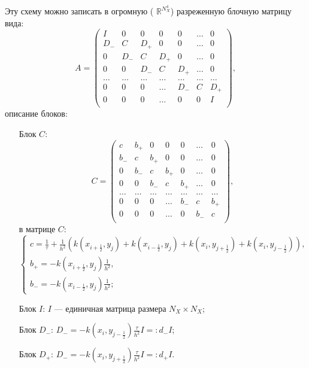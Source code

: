 \documentclass[14pt,a4paper]{extarticle}
\newcommand{\1}{\mathbbm{1}}
\newcommand{\R}{\mathbb{R}}
\begin{document}
Эту схему можно записать в огромную ( $\R ^{N_X^4}$) разреженную блочную матрицу вида:
$$A = \begin{pmatrix}
    I   & 0   & 0     & 0   & 0   & \ldots & 0 \\
    D_-   & C   & D_+   & 0   & 0   & \ldots & 0 \\
    0   & D_-   & C     & D_+ & 0   & \ldots & 0 \\
    0   & 0   & D_-   & C   & D_+ & \ldots & 0 \\
    \ldots & \ldots & \ldots & \ldots & \ldots & \ldots & \ldots \\
    0   & 0   & 0    & \ldots & D_- & C & D_+ \\
    0   & 0   & 0     & \ldots & 0 & 0 & I \\
\end{pmatrix},
$$
описание блоков:
\begin{enumerate}
    \item[Блок $C$:] $$C = \begin{pmatrix}
    c   & b_+ & 0     & 0   & 0   & \ldots & 0 \\
    b_- & c   & b_+   & 0   & 0   & \ldots & 0 \\
    0   & b_- & c     & b_+ & 0   & \ldots & 0 \\
    0   & 0   & b_-   & c   & b_+ & \ldots & 0 \\
    \ldots & \ldots & \ldots & \ldots & \ldots & \ldots & \ldots \\
    0   & 0   & 0    & \ldots & b_- & c & b_+ \\
    0   & 0   & 0     & \ldots & 0 & b_- & c \\
\end{pmatrix},
$$
в матрице $C$:
$$
\left\{\begin{array}{l}
 c = \frac{1}{\tau} + \frac{1}{h^2} \left(k(x_{i + \frac{1}{2}}, y_{j}) + k(x_{i - \frac{1}{2}}, y_{j}) + k(x_{i}, y_{j+ \frac{1}{2}}) + k(x_{i}, y_{j- \frac{1}{2}})\right), \\
 b_+ = -k(x_{i + \frac{1}{2}}, y_j) \frac{1}{h^2}, \\
 b_- = -k(x_{i - \frac{1}{2}}, y_j) \frac{1}{h^2};
\end{array}\right. 
$$
\item[Блок $I$:] $I$ --- единичная матрица размера $N_X\times N_X$; 
\item[Блок $D_-$:] $D_- = -k(x_{i}, y_{j- \frac{1}{2}}) \frac{\tau}{h^2} I =: d_- I$;
\item[Блок $D_+$:] $D_- = -k(x_{i}, y_{j+ \frac{1}{2}}) \frac{\tau}{h^2} I =: d_+ I$.
\end{enumerate}
\end{document}
